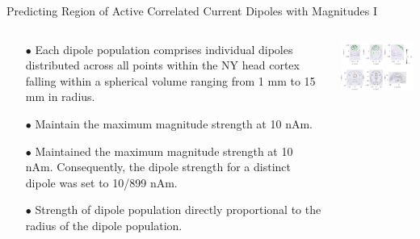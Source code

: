 \documentclass[aspectratio=169, 9pt]{beamer}
\begin{document}
\begin{frame}{Predicting Region of Active Correlated Current Dipoles with Magnitudes I}
        \begin{columns}
          \begin{column}{0.5\textwidth}
              \begin{itemize}
          \item[$\bullet$] Each dipole population comprises individual dipoles distributed across all points within the NY head cortex falling within a spherical volume ranging from 1 mm to 15 mm in radius.
          \item[$\bullet$] Maintain the maximum magnitude strength at 10 nAm.
          \item[$\bullet$] Maintained the maximum magnitude strength at 10 nAm. Consequently, the dipole strength for a distinct dipole was set to 10/899 nAm.
          \item[$\bullet$] Strength of dipole population directly proportional to the radius of the dipole population.
          \end{itemize}
          \end{column}
          \begin{column}{0.5\textwidth}
            \includegraphics[width=7cm]{figures/dipole_area_reduced_0.pdf}
          \end{column}
          \end{columns}

\end{frame}
\end{document}
